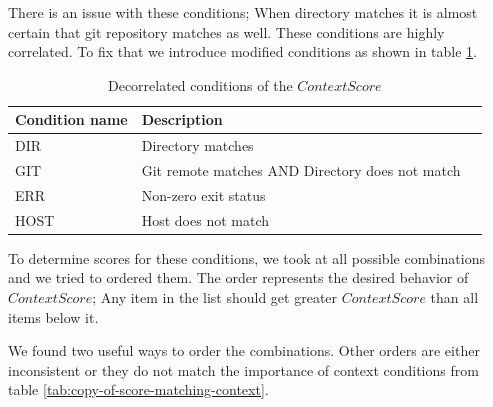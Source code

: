 There is an issue with these conditions; When directory matches it is almost certain that git repository matches as well. These conditions are highly correlated.
To fix that we introduce modified conditions as shown in table \ref{tab:score-context-impl-decorrelated}.

\begin{table}[h!]
\centering
\begin{tabular}{lll}
\hline \hline
Condition name & Description \\
\hline
DIR         & Directory matches \\ 
GIT         & Git remote matches AND Directory does not match\\ 
ERR         & Non-zero exit status \\
HOST        & Host does not match \\ 
\hline \hline
\end{tabular}
\caption{Decorrelated conditions of the \(ContextScore\)}
\label{tab:score-context-impl-decorrelated}
\end{table}

To determine scores for these conditions, we took at all possible combinations and we tried to ordered them. The order represents the desired behavior of \(ContextScore\); Any item in the list should get greater \(ContextScore\) than all items below it.


We found two useful ways to order the combinations. Other orders are either inconsistent or they do not match the importance of context conditions from table \ref{tab:copy-of-score-matching-context}. %

